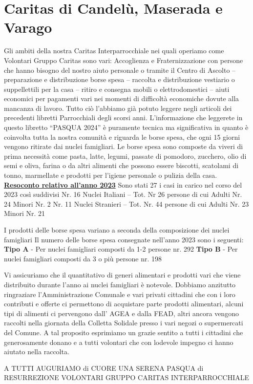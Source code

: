 \section{Caritas di Candelù, Maserada e Varago}
Gli ambiti della nostra Caritas Interparrocchiale nei quali operiamo come Volontari Gruppo Caritas sono vari: Accoglienza e Fraternizzazione con persone che hanno bisogno del nostro aiuto personale o tramite il Centro di Ascolto – preparazione e distribuzione borse spesa – raccolta e distribuzione vestiario o suppellettili per la casa – ritiro e consegna mobili o elettrodomestici – aiuti economici per pagamenti vari nei momenti di difficoltà economiche dovute alla mancanza di lavoro.                         
Tutto ciò l’abbiamo già potuto leggere negli articoli dei precedenti libretti Parrocchiali   degli scorsi  anni.
L’informazione che leggerete in questo libretto “PASQUA 2024” è puramente tecnica ma   significativa in quanto è coinvolta  tutta la nostra comunità e riguarda le borse spesa,   che ogni 15 giorni vengono ritirate dai nuclei famigliari.
Le borse spesa sono composte da viveri di prima necessità come pasta, latte, legumi, passate di pomodoro, zucchero, olio di semi e oliva, farina o da altri alimenti che possono essere biscotti, scatolami di tonno, marmellate e prodotti per l’igiene personale o pulizia della casa.
\textbf{\underline{Resoconto relativo all’anno  2023}}
Sono stati 27 i casi in carico nel corso del 2023 così suddivisi
Nr. 16 Nuclei Italiani  – Tot. Nr  26 persone di cui  Adulti Nr. 24  Minori Nr. 2
Nr. 11 Nuclei Stranieri – Tot. Nr. 44 persone di cui  Adulti Nr. 23  Minori Nr. 21

I prodotti delle borse spesa variano a seconda della composizione dei nuclei famigliari  
Il numero delle borse spesa consegnate nell’anno 2023 sono i seguenti:
\textbf{Tipo A} - Per nuclei famigliari composti da 1-2 persone       nr.  292
\textbf{Tipo B} - Per nuclei famigliari composti da 3 o più persone   nr.  198

Vi assicuriamo che il quantitativo di generi alimentari e prodotti vari che viene distribuito durante l’anno ai nuclei famigliari è notevole.
Dobbiamo anzitutto ringraziare l’Amministrazione Comunale e vari privati cittadini che con i loro contributi e offerte ci permettono di acquistare parte prodotti alimentari, alcuni tipi di alimenti ci pervengono dall’ AGEA e dalla FEAD, altri ancora vengono raccolti nella giornata della Colletta Solidale presso i vari negozi o supermercati del Comune.                A tal proposito esprimiamo un grazie sentito a tutti i cittadini che generosamente donano   e a tutti volontari che con lodevole impegno ci hanno aiutato nella raccolta.

A TUTTI AUGURIAMO di CUORE UNA SERENA PASQUA di RESURREZIONE
VOLONTARI GRUPPO CARITAS INTERPARROCCHIALE

